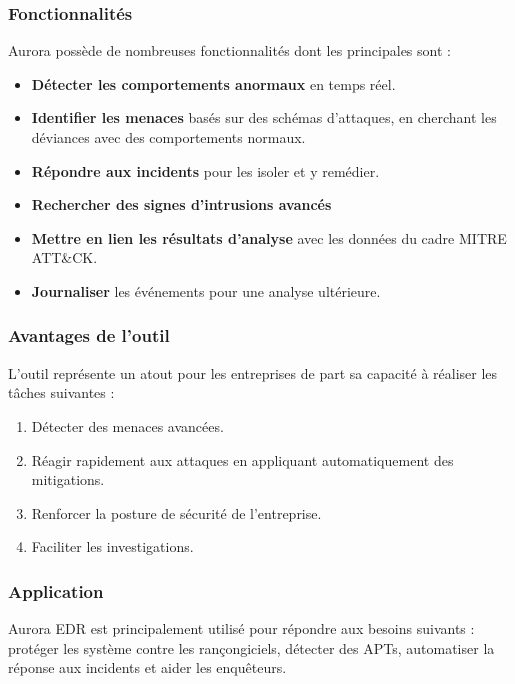 \documentclass[12pt,letterpaper]{article}
\begin{document}
\subsubsection{Fonctionnalités}

Aurora possède de nombreuses fonctionnalités dont les principales sont :
\begin{itemize}
    \item \textbf{Détecter les comportements anormaux} en temps réel.
    \item \textbf{Identifier les menaces} basés sur des schémas d'attaques, en cherchant les déviances avec des comportements normaux.
    \item \textbf{Répondre aux incidents} pour les isoler et y remédier.
    \item \textbf{Rechercher des signes d'intrusions avancés}
    \item \textbf{Mettre en lien les résultats d'analyse} avec les données du cadre MITRE ATT\&CK.
    \item \textbf{Journaliser} les événements pour une analyse ultérieure.
\end{itemize}

\subsubsection{Avantages de l'outil}

L'outil représente un atout pour les entreprises de part sa capacité à réaliser les tâches suivantes :
\begin{enumerate}
    \item Détecter des menaces avancées.
    \item Réagir rapidement aux attaques en appliquant automatiquement des mitigations.
    \item Renforcer la posture de sécurité de l'entreprise.
    \item Faciliter les investigations.
\end{enumerate}

\subsubsection{Application}

Aurora EDR est principalement utilisé pour répondre aux besoins suivants : protéger les système contre les rançongiciels, détecter des APTs, automatiser la réponse aux incidents et aider les enquêteurs.

\bigskip
\end{document}
